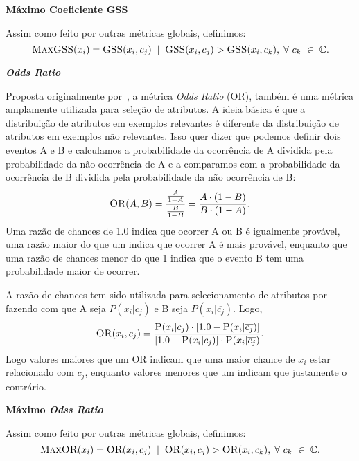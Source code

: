 \begin{description}
\item{\textbf{Máximo Coeficiente GSS}}
\label{item::maxgss}

Assim como feito por outras métricas globais, definimos:
\begin{equation}\label{eqn::maxgss}
\textsc{MaxGSS}(x_i) = \textsc{GSS}(x_i,c_j) \; \; | \;\; \textsc{GSS}(x_i, c_j) > \textsc{GSS}(x_i, c_k), \; \forall\ c_k\ \in\ \mathbb{C}.
\end{equation}

\item{\textbf{\textit{Odds Ratio}}}
\label{item::or}

Proposta originalmente por~\cite{Rijsbergen79}, a métrica \textit{Odds Ratio} (\textsc{OR}), também é uma métrica amplamente utilizada para seleção de atributos. A ideia básica é que a distribuição de atributos em exemplos relevantes é diferente da distribuição de atributos em exemplos não relevantes. Isso quer dizer que podemos definir dois eventos A e B e calculamos a probabilidade da ocorrência de A dividida pela probabilidade da não ocorrência de A e a comparamos com a probabilidade da ocorrência de B dividida pela probabilidade da não ocorrência de B:
\begin{equation}\label{eqn::or}
   \textsc{OR}(A, B) = \frac{\frac{A}{1-A}} {\frac{B}{1-B}} = \frac{ A \cdot ( 1 - B )} { B \cdot ( 1 - A ) } .
\end{equation}
Uma razão de chances de 1.0 indica que ocorrer A ou B é igualmente provável, uma razão maior do que um indica que ocorrer A é mais provável, enquanto que uma razão de chances menor do que 1 indica que o evento B tem uma probabilidade maior de ocorrer.

A razão de chances tem sido utilizada para selecionamento de atributos por \cite{Mladenic98} fazendo com que A seja $P(x_i|c_j)$ e B seja $P(x_i|\overline{c_j})$. Logo,
\begin{equation}\label{eqn::or}
   \textsc{OR}(x_i, c_j) = \frac{ \textsc{P}(x_i|c_j) \cdot [ 1.0 - \textsc{P}(x_i|\overline{c_j}) ] }{ [ 1.0 - \textsc{P}(x_i|c_j) ] \cdot \textsc{P}(x_i|\overline{c_j})}.
\end{equation}
Logo valores maiores que um \textsc{OR} indicam que uma maior chance de $x_i$ estar relacionado com $c_j$, enquanto valores menores que um indicam que justamente o contrário.

\item{\textbf{Máximo \textit{Odss Ratio}}}
\label{item::maxor}

Assim como feito por outras métricas globais, definimos:
\begin{equation}\label{eqn::maxor}
\textsc{MaxOR}(x_i) = \textsc{OR}(x_i,c_j) \; \; | \;\; \textsc{OR}(x_i, c_j) > \textsc{OR}(x_i, c_k), \; \forall\ c_k\ \in\ \mathbb{C}.
\end{equation}


\end{description}

